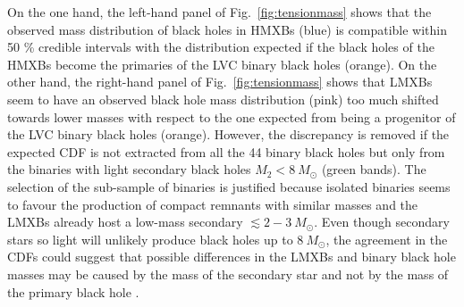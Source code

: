 \documentclass[a4paper,titlepage]{book}     	%
\newcommand{\sun}{\ensuremath{_\odot}}
\newcommand{\msun}{\ensuremath{M\sun}}
\begin{document}
On the one hand, the left-hand panel of Fig.\ \ref{fig:tensionmass} shows that the observed mass distribution of black holes in HMXBs (blue) is compatible within 50 \% credible intervals with the distribution expected if the black holes of the HMXBs become the primaries of the LVC binary black holes (orange). On the other hand, the right-hand panel of Fig.\ \ref{fig:tensionmass} shows that LMXBs seem to have an observed black hole mass distribution (pink) too much shifted towards lower masses with respect to the one expected from being a progenitor of the LVC binary black holes (orange). However, the discrepancy is removed if the expected CDF is not extracted from all the 44 binary black holes but only from the binaries with light secondary black holes $M_2 < 8~\msun$ (green bands). The selection of the sub-sample of binaries is justified because isolated binaries seems to favour the production of compact remnants with similar masses and the LMXBs already host a low-mass secondary $\lesssim 2-3~\msun$. Even though secondary stars so light will unlikely produce black holes up to $8~\msun$, the agreement in the CDFs could suggest that possible differences in the LMXBs and binary black hole masses may be caused by the mass of the secondary star and not by the mass of the primary black hole \cite{HMXBH_spins2021}.
\end{document}
